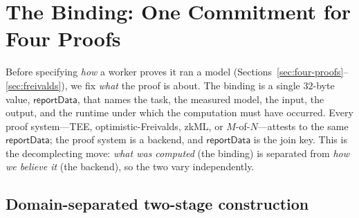 \section{The Binding: One Commitment for Four Proofs}
\label{sec:binding}

Before specifying \emph{how} a worker proves it ran a model
(Sections~\ref{sec:four-proofs}--\ref{sec:freivalds}), we fix \emph{what} the
proof is about. The binding is a single $32$-byte value, $\mathsf{reportData}$,
that names the task, the measured model, the input, the output, and the runtime
under which the computation must have occurred. Every proof system---TEE,
optimistic-Freivalds, zkML, or $M$-of-$N$---attests to the same
$\mathsf{reportData}$; the proof system is a backend, and $\mathsf{reportData}$ is
the join key. This is the decomplecting move: \emph{what was computed} (the
binding) is separated from \emph{how we believe it} (the backend), so the two vary
independently.

\subsection{Domain-separated two-stage construction}

